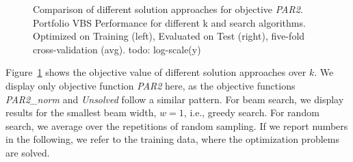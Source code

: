 \documentclass[conference]{IEEEtran}
\begin{document}
\begin{figure}[t]
	\centering
	\hfil
	\caption{Comparison of different solution approaches for objective \emph{PAR2}. Portfolio VBS Performance for different k and search algorithms. Optimized on Training (left), Evaluated on Test (right), five-fold cross-validation (avg). todo: log-scale(y)}
	\label{fig:search-train-objective}
\end{figure}

Figure~\ref{fig:search-train-objective} shows the objective value of different solution approaches over $k$.
We display only objective function \emph{PAR2} here, as the objective functions \emph{PAR2\_norm} and \emph{Unsolved} follow a similar pattern.
For beam search, we display results for the smallest beam width, $w=1$, i.e., greedy search.
For random search, we average over the repetitions of random sampling.
If we report numbers in the following, we refer to the training data, where the optimization problems are solved.
\end{document}
